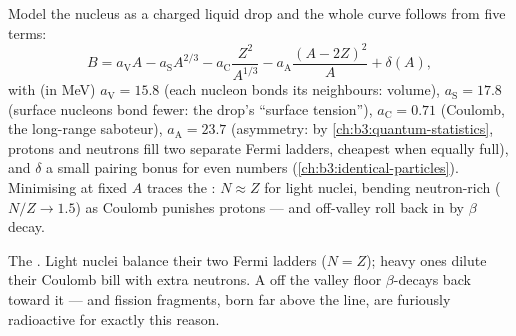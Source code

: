 \begin{proposition}\label{prop:b3:nuclear-physics:semf}
Model the nucleus as a charged liquid drop and the whole curve
follows from five terms:
\[
B = a_{\text{V}}A - a_{\text{S}}A^{2/3}
- a_{\text{C}}\frac{Z^2}{A^{1/3}}
- a_{\text{A}}\frac{(A - 2Z)^2}{A} + \delta(A) ,
\]
with (in \unit{MeV}) $a_{\text{V}} = 15.8$ (each nucleon bonds its
neighbours: volume), $a_{\text{S}} = 17.8$ (surface nucleons bond
fewer: the drop's ``surface tension''), $a_{\text{C}} = 0.71$
(Coulomb, the long-range saboteur), $a_{\text{A}} = 23.7$
(asymmetry: by \cref{ch:b3:quantum-statistics}, protons and
neutrons fill two separate Fermi ladders, cheapest when equally
full), and $\delta$ a small pairing bonus for even numbers
(\cref{ch:b3:identical-particles}). Minimising at fixed $A$ traces
the \emph{}: $N \approx Z$ for light nuclei,
bending neutron-rich ($N/Z \to 1.5$) as Coulomb punishes protons
--- and off-valley  roll back in by $\beta$ decay.
\end{proposition}
\admitted

\begin{omfigure}

{\small The . Light nuclei balance their two
Fermi ladders ($N = Z$); heavy ones dilute their Coulomb bill with
extra neutrons. A  off the valley floor $\beta$-decays back
toward it --- and fission fragments, born far above the line, are
furiously radioactive for exactly this reason.}
\end{omfigure}

